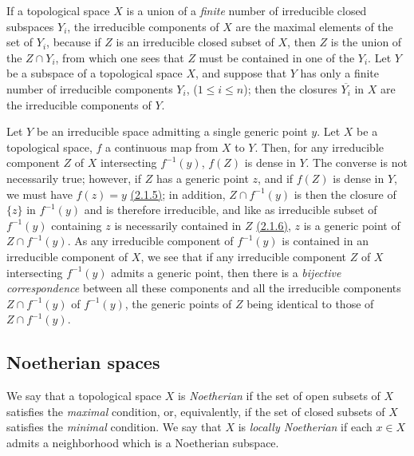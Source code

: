 \begin{env}[2.1.7]
\label{0.2.1.7}
If a topological space $X$ is a union of a {\em finite} number of irreducible
closed subspaces $Y_i$, the irreducible components of $X$ are the maximal
elements of the set of $Y_i$, because if $Z$ is an irreducible closed subset of
$X$, then $Z$ is the union of the $Z\cap Y_i$, from which one sees that $Z$ must
be contained in one of the $Y_i$. Let $Y$ be a subspace of a topological space
$X$, and suppose that $Y$ has only a finite number of irreducible components
$Y_i$, ($1\leqslant i\leqslant n$); then the closures $\overline{Y_i}$ in $X$
are the irreducible components of $Y$.
\end{env}

\begin{env}[2.1.8]
\label{0.2.1.8}
Let $Y$ be an irreducible space admitting a single generic point $y$. Let $X$ be
a topological space, $f$ a continuous map from $X$ to $Y$. Then, for any
irreducible component $Z$ of $X$ intersecting $f^{-1}(y)$, $f(Z)$ is dense in
$Y$. The converse is not necessarily true; however, if $Z$ has a generic point
$z$, and if $f(Z)$ is dense in $Y$, we must have $f(z)=y$ \hyperref[0.2.1.5]{(2.1.5)}; in
addition, $Z\cap f^{-1}(y)$ is then the closure of $\{z\}$ in $f^{-1}(y)$ and is
therefore irreducible, and like as irreducible subset of $f^{-1}(y)$ containing
$z$ is necessarily contained in $Z$ \hyperref[0.2.1.6]{(2.1.6)}, $z$ is a generic point of
$Z\cap f^{-1}(y)$. As any irreducible component of $f^{-1}(y)$ is contained in
an irreducible component of $X$, we see that if any irreducible component $Z$ of
$X$ intersecting $f^{-1}(y)$ admits a generic point, then there is a
{\em bijective correspondence} between all these components and all the
irreducible components $Z\cap f^{-1}(y)$ of $f^{-1}(y)$, the generic points of
$Z$ being identical to those of $Z\cap f^{-1}(y)$.
\end{env}

\subsection{Noetherian spaces}
\label{subsection-noetherian-spaces}

\begin{env}[2.2.1]
\label{0.2.2.1}
We say that a topological space $X$ is {\em Noetherian} if the set of open
subsets of $X$ satisfies the {\em maximal} condition, or, equivalently, if the
set of closed subsets of $X$ satisfies the {\em minimal} condition. We say that
$X$ is {\em locally Noetherian} if each $x\in X$ admits a neighborhood which is
a Noetherian subspace.
\end{env}

